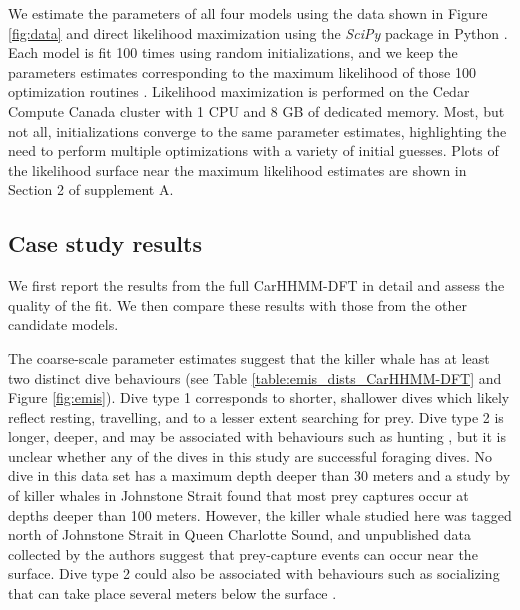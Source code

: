 We estimate the parameters of all four models using the data shown in Figure \ref{fig:data} and direct likelihood maximization using the \textit{SciPy} package in Python \citep{Virtanen:2019}. Each model is fit 100 times using random initializations, and
we keep the parameters estimates corresponding to the maximum likelihood of those 100 optimization routines \citep{Zucchini:2016}. Likelihood maximization is performed on the Cedar Compute Canada cluster with 1 CPU and 8 GB of dedicated memory. Most, but not all, initializations converge to the same parameter estimates, highlighting the need to perform multiple optimizations with a variety of initial guesses. Plots of the likelihood surface near the maximum likelihood estimates are shown in Section 2 of supplement A. 

\subsection{Case study results}

We first report the results from the full CarHHMM-DFT in detail and assess the quality of the fit. We then compare these results with those from the other candidate models.

The coarse-scale parameter estimates suggest that the killer whale has at least two distinct dive behaviours (see Table \ref{table:emis_dists_CarHHMM-DFT} and Figure \ref{fig:emis}). 
Dive type 1 corresponds to shorter, shallower dives which likely reflect resting, travelling, and to a lesser extent searching for prey.
Dive type 2 is longer, deeper, and may be associated with behaviours such as hunting  \citep{Tennessen:2019b}, but it is unclear whether any of the dives in this study are successful foraging dives. No dive in this data set has a maximum depth deeper than 30 meters and a study by \citet{Wright:2017} of killer whales in Johnstone Strait found that most prey captures occur at depths deeper than 100 meters. However, the killer whale studied here was tagged north of Johnstone Strait in Queen Charlotte Sound, and %
unpublished data collected by the authors suggest that %
prey-capture events can occur near the surface. %
Dive type 2 could also be associated with behaviours such as socializing that can take place several meters below the surface \citep{Tennessen:2019b}.

